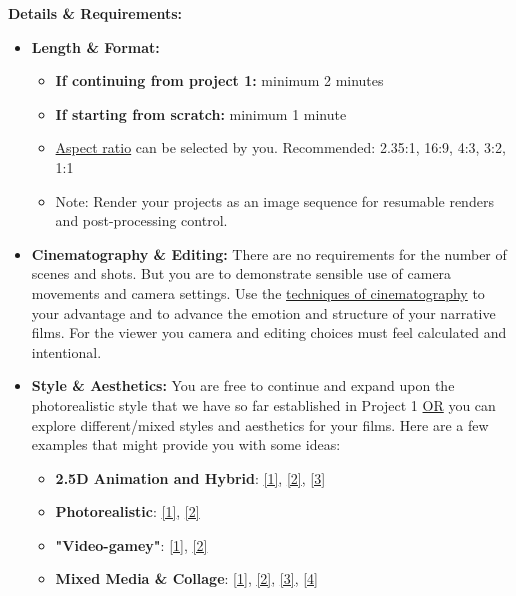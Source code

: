 \textbf{Details \& Requirements:}
\begin{itemize}
	\tightlist
	\item \textbf{Length \& Format:}
	      \begin{itemize}
		      \item \textbf{If continuing from project 1:} minimum 2 minutes
		      \item \textbf{If starting from scratch:} minimum 1 minute
		      \item \href{https://en.wikipedia.org/wiki/Aspect_ratio_(image)#/media/File:Filmaspectratios.svg}{Aspect ratio} can be selected by you. Recommended: 2.35:1, 16:9, 4:3, 3:2, 1:1
		      \item Note: Render your projects as an image sequence for resumable renders and post-processing control.
	      \end{itemize}
	\item \textbf{Cinematography \& Editing:} There are no requirements for the number of scenes and shots. But you are to demonstrate sensible use of camera movements and camera settings. Use the \href{https://www.studiobinder.com/blog/ultimate-guide-to-camera-shots/}{techniques of cinematography} to your advantage and to advance the emotion and structure of your narrative films. For the viewer you camera and editing choices must feel calculated and intentional.
	\item \textbf{Style \& Aesthetics:} You are free to continue and expand upon the photorealistic style that we have so far established in Project 1 \ul{OR} you can explore different/mixed styles and aesthetics for your films. Here are a few examples that might provide you with some ideas:
	      \begin{itemize}
		      \item \textbf{2.5D Animation and Hybrid}: \href{https://www.youtube.com/watch?v=Cl_EhU7elyo}{[1]}, \href{https://www.youtube.com/watch?v=tobqZ8fMqBk}{[2]}, \href{https://www.youtube.com/watch?v=C8puJClvNYE}{[3]}
		      \item \textbf{Photorealistic}: \href{https://vimeo.com/297358261}{[1]}, \href{https://vimeo.com/385177134}{[2]}
		      \item \textbf{"Video-gamey"}: \href{https://www.youtube.com/watch?v=_GQWMnEskrY}{[1]}, \href{https://www.youtube.com/watch?v=8-ig_lnO7uU}{[2]}
		      \item \textbf{Mixed Media \& Collage}: \href{https://vimeo.com/167957360}{[1]}, \href{https://vimeo.com/hiradsab/outlier}{[2]}, \href{https://vimeo.com/203361631}{[3]}, \href{https://vimeo.com/181219125}{[4]}

\end{itemize}
\end{itemize}
